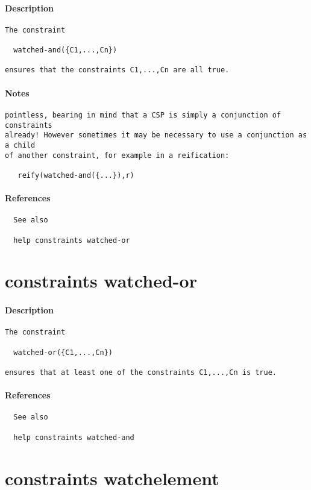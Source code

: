 \paragraph{Description}
{\footnotesize
\begin{verbatim}
The constraint

  watched-and({C1,...,Cn})

ensures that the constraints C1,...,Cn are all true.
\end{verbatim}
}
\paragraph{Notes}
{\footnotesize
\begin{verbatim}
pointless, bearing in mind that a CSP is simply a conjunction of constraints
already! However sometimes it may be necessary to use a conjunction as a child
of another constraint, for example in a reification:

   reify(watched-and({...}),r)
\end{verbatim}
}
\paragraph{References}
{\footnotesize
\begin{verbatim}
  See also

  help constraints watched-or
\end{verbatim}
}
\section{constraints watched-or}
\paragraph{Description}
{\footnotesize
\begin{verbatim}
The constraint

  watched-or({C1,...,Cn})

ensures that at least one of the constraints C1,...,Cn is true.
\end{verbatim}
}
\paragraph{References}
{\footnotesize
\begin{verbatim}
  See also

  help constraints watched-and
\end{verbatim}
}
\section{constraints watchelement}
